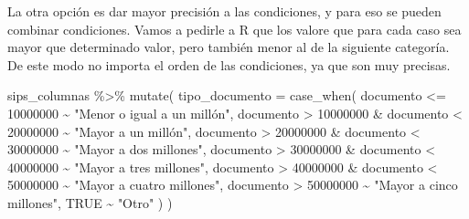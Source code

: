 \documentclass[
  letterpaper,
  DIV=11,
  numbers=noendperiod]{scrreprt}
\newenvironment{Shaded}{\begin{snugshade}}{\end{snugshade}}
\newcommand{\AttributeTok}[1]{\textcolor[rgb]{0.40,0.45,0.13}{#1}}
\newcommand{\ConstantTok}[1]{\textcolor[rgb]{0.56,0.35,0.01}{#1}}
\newcommand{\DecValTok}[1]{\textcolor[rgb]{0.68,0.00,0.00}{#1}}
\newcommand{\FunctionTok}[1]{\textcolor[rgb]{0.28,0.35,0.67}{#1}}
\newcommand{\NormalTok}[1]{\textcolor[rgb]{0.00,0.23,0.31}{#1}}
\newcommand{\SpecialCharTok}[1]{\textcolor[rgb]{0.37,0.37,0.37}{#1}}
\newcommand{\StringTok}[1]{\textcolor[rgb]{0.13,0.47,0.30}{#1}}
\begin{document}
La otra opción es dar mayor precisión a las condiciones, y para eso se
pueden combinar condiciones. Vamos a pedirle a R que los valore que para
cada caso sea mayor que determinado valor, pero también menor al de la
siguiente categoría. De este modo no importa el orden de las
condiciones, ya que son muy precisas.

\begin{Shaded}
\begin{Highlighting}[]
\NormalTok{sips\_columnas }\SpecialCharTok{\%\textgreater{}\%} \FunctionTok{mutate}\NormalTok{(}
  \AttributeTok{tipo\_documento =} \FunctionTok{case\_when}\NormalTok{(}
\NormalTok{    documento }\SpecialCharTok{\textless{}=} \DecValTok{10000000} \SpecialCharTok{\textasciitilde{}} \StringTok{"Menor o igual a un millón"}\NormalTok{,}
\NormalTok{    documento }\SpecialCharTok{\textgreater{}} \DecValTok{10000000} \SpecialCharTok{\&}\NormalTok{ documento }\SpecialCharTok{\textless{}} \DecValTok{20000000} \SpecialCharTok{\textasciitilde{}} \StringTok{"Mayor a un millón"}\NormalTok{,}
\NormalTok{    documento }\SpecialCharTok{\textgreater{}} \DecValTok{20000000} \SpecialCharTok{\&}\NormalTok{ documento }\SpecialCharTok{\textless{}} \DecValTok{30000000} \SpecialCharTok{\textasciitilde{}} \StringTok{"Mayor a dos millones"}\NormalTok{,}
\NormalTok{    documento }\SpecialCharTok{\textgreater{}} \DecValTok{30000000} \SpecialCharTok{\&}\NormalTok{ documento }\SpecialCharTok{\textless{}} \DecValTok{40000000} \SpecialCharTok{\textasciitilde{}} \StringTok{"Mayor a tres millones"}\NormalTok{,}
\NormalTok{    documento }\SpecialCharTok{\textgreater{}} \DecValTok{40000000} \SpecialCharTok{\&}\NormalTok{ documento }\SpecialCharTok{\textless{}} \DecValTok{50000000} \SpecialCharTok{\textasciitilde{}} \StringTok{"Mayor a cuatro millones"}\NormalTok{,}
\NormalTok{    documento }\SpecialCharTok{\textgreater{}} \DecValTok{50000000} \SpecialCharTok{\textasciitilde{}} \StringTok{"Mayor a cinco millones"}\NormalTok{,}
    \ConstantTok{TRUE} \SpecialCharTok{\textasciitilde{}} \StringTok{"Otro"}
\NormalTok{  )}
\NormalTok{)}
\end{Highlighting}
\end{Shaded}
\end{document}
